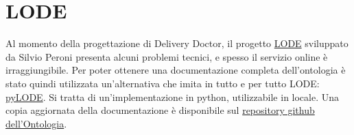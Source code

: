 \documentclass[12pt]{article}
\begin{document}
\section{LODE}
Al momento della progettazione di Delivery Doctor, il progetto \href{https://github.com/essepuntato/LODE}{LODE} sviluppato da Silvio Peroni presenta alcuni problemi tecnici, e spesso il servizio online è irraggiungibile. Per poter ottenere una documentazione completa dell'ontologia è stato quindi utilizzata un'alternativa che imita in tutto e per tutto LODE: \href{https://github.com/RDFLib/pyLODE}{pyLODE}. Si tratta di un'implementazione in python, utilizzabile in locale.\newline
Una copia aggiornata della documentazione è disponibile sul \href{https://lorenzosciandra.github.io/DeliveryDoctor/documentation/lode.html}{repository github dell'Ontologia}.

\end{document}
